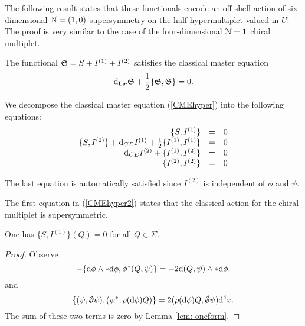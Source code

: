 \documentclass[10pt, oneside]{article}
\begin{document}

The following result states that these functionals encode an off-shell action of six-dimensional $\mathcal N=(1,0)$ supersymmetry on the half hypermultiplet valued in $U$. 
The proof is very similar to the case of the four-dimensional $\mathcal N=1$ chiral multiplet. 

\begin{thm}
The functional $\mathfrak S = S + I^{(1)} + I^{(2)}$ satisfies the classical master equation
\begin{equation}\label{CMEhyper}
{\rm d}_{\rm Lie} \mathfrak S + \frac{1}{2} \{\mathfrak S, \mathfrak S\} = 0 .
\end{equation}
\end{thm}

We decompose the classical master equation (\ref{CMEhyper}) into the following equations:
\begin{equation}\label{CMEhyper2}
\begin{array}{rrrrrr}
\{S , I^{(1)}\} & = & 0 \\ 
\{S, I^{(2)}\} + {\rm d}_{CE} I^{(1)} + \frac{1}{2} \{I^{(1)}, I^{(1)}\} & = & 0 \\
{\rm d}_{CE} I^{(2)} + \{I^{(1)}, I^{(2)}\} & =& 0 \\
\{I^{(2)}, I^{(2)}\} & =& 0
\end{array}
\end{equation}

The last equation is automatically satisfied since $I^{(2)}$ is independent of $\phi$ and $\psi$. 

The first equation in (\ref{CMEhyper2}) states that the classical action for the chiral multiplet is supersymmetric. 

\begin{lemma} 
One has $\{S, I^{(1)}\} (Q) = 0$ for all $Q \in \Sigma$. 
\end{lemma}
\begin{proof}
Observe
\[
- \{{\rm d} \phi \wedge * {\rm d} \phi, \phi^*  (Q, \psi) \} = - 2 {\rm d} (Q, \psi) \wedge * {\rm d} \phi .
\]
and
\[
\{(\psi, \sd \dd \psi) , (\psi^*, \rho(\d \phi) Q) \} = 2 (\rho(\d \phi) Q, \sd \dd \psi) \d^4 x .
\]
The sum of these two terms is zero by Lemma \ref{lem: oneform}. 
\end{proof}
\end{document}
